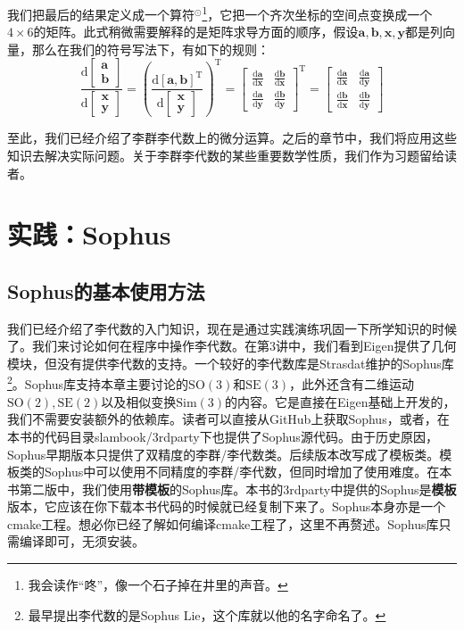 我们把最后的结果定义成一个算符$^\odot$\footnote{我会读作“咚”，像一个石子掉在井里的声音。}，它把一个齐次坐标的空间点变换成一个$4 \times 6$的矩阵。此式稍微需要解释的是矩阵求导方面的顺序，假设$\bm{a}, \bm{b}, \bm{x}, \bm{y}$都是列向量，那么在我们的符号写法下，有如下的规则：
\begin{equation}
\frac{\mathrm{\mathrm{d}}\begin{bmatrix}
\bm{a}\\
\bm{b}
\end{bmatrix}}{{\mathrm{d} \begin{bmatrix}
\bm{x}\\
\bm{y}
\end{bmatrix}}} = {\left( \frac{\mathrm{d}[\bm{a},\bm{b}]^\mathrm{T}}{{\mathrm{d}\begin{bmatrix}
\bm{x}\\
\bm{y}
\end{bmatrix}}} \right)^\mathrm{T}} = {{\begin{bmatrix}
{\frac{{\mathrm{d}\bm{a}}}{{\mathrm{d}\bm{x}}}}&{\frac{{\mathrm{d}\bm{b}}}{{\mathrm{d}\bm{x}}}}\\
{\frac{{\mathrm{d}\bm{a}}}{{\mathrm{d}\bm{y}}}}&{\frac{{\mathrm{d}\bm{b}}}{{\mathrm{d}\bm{y}}}}
\end{bmatrix}} ^\mathrm{T}} = {\begin{bmatrix}
{\frac{{\mathrm{d}\bm{a}}}{{\mathrm{d}\bm{x}}}}&{\frac{{\mathrm{d}\bm{a}}}{{\mathrm{d}\bm{y}}}}\\
{\frac{{\mathrm{d}\bm{b}}}{{\mathrm{d}\bm{x}}}}&{\frac{{\mathrm{d}\bm{b}}}{{\mathrm{d}\bm{y}}}}
\end{bmatrix}}
\end{equation}

至此，我们已经介绍了李群李代数上的微分运算。之后的章节中，我们将应用这些知识去解决实际问题。关于李群李代数的某些重要数学性质，我们作为习题留给读者。

\section{实践：Sophus}
\subsection{Sophus的基本使用方法}
我们已经介绍了李代数的入门知识，现在是通过实践演练巩固一下所学知识的时候了。我们来讨论如何在程序中操作李代数。在第3讲中，我们看到Eigen提供了几何模块，但没有提供李代数的支持。一个较好的李代数库是Strasdat维护的Sophus库\footnote{最早提出李代数的是Sophus Lie，这个库就以他的名字命名了。}。Sophus库支持本章主要讨论的$\mathrm{SO}(3)$和$\mathrm{SE}(3)$，此外还含有二维运动$\mathrm{SO}(2), \mathrm{SE}(2)$以及相似变换$\mathrm{Sim}(3)$的内容。它是直接在Eigen基础上开发的，我们不需要安装额外的依赖库。读者可以直接从GitHub上获取Sophus，或者，在本书的代码目录slambook/3rdparty下也提供了Sophus源代码。由于历史原因，Sophus早期版本只提供了双精度的李群/李代数类。后续版本改写成了模板类。模板类的Sophus中可以使用不同精度的李群/李代数，但同时增加了使用难度。在本书第二版中，我们使用\textbf{带模板}的Sophus库。本书的3rdparty中提供的Sophus是\textbf{模板}版本，它应该在你下载本书代码的时候就已经复制下来了。Sophus本身亦是一个cmake工程。想必你已经了解如何编译cmake工程了，这里不再赘述。Sophus库只需编译即可，无须安装。

